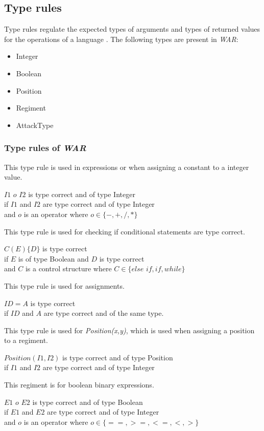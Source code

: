 \subsection{Type rules}
	Type rules regulate the expected types of arguments and 
	types of returned values for the operations of a language \cite{TypeRule}.
	The following types are present in \textit{WAR}: \\
	\begin{itemize}
		\item Integer
		\item Boolean
		\item Position
		\item Regiment
		\item AttackType
	\end{itemize}
	
	\subsubsection{Type rules of \textit{WAR}}
	This type rule is used in expressions or when assigning a constant to a integer value.
	\begin{typerule} 
		$I1$ $ o $ $I2$ is type correct and of type Integer \\
		if $I1$ and $I2$ are type correct and of type Integer \\
		and $o$ is an operator where $o\in \{-,+,/,* \}$
	\end{typerule}
	This type rule is used for checking if conditional statements are type correct.
	\begin{typerule} 
		$C(E)\{D\}$ is type correct\\
		if $E$ is of type Boolean and $D$ is type correct \\
		and $C$ is a control structure where $C \in \{else$ $if, if, while\}$
	\end{typerule}
	This type rule is used for assignments.
	\begin{typerule} 
		$ID = A$ is type correct\\
		if $ID$ and $A$ are type correct and of the same type.
	\end{typerule}
	This type rule is used for {\it Position(x,y)}, which is used when assigning a 
	position to a regiment.
	\begin{typerule} 
		$Position(I1,I2)$ is type correct and of type Position\\
		if $I1$ and $I2$ are type correct and of type Integer
	\end{typerule}
	This regiment is for boolean binary expressions.
	\begin{typerule} 
		$E1$ $ o $ $E2$ is type correct and of type Boolean\\
		if $E1$ and $E2$ are type correct and of type Integer \\
		and $o$ is an operator where $o\in \{ ==,>=,<=,<,> \}$
	\end{typerule}
	
